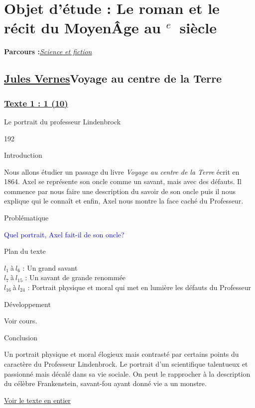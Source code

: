 \documentclass[12pt,a4paper]{article}
\begin{document}
		\section[Sciences et fiction]{Objet d'\'etude : Le roman et le r\'ecit du Moyen\^Age au \textsc{}$^{e}$~siècle}
		\textbf{Parcours :}\textit{\underline{Science et fiction}}
			\subsection{\href{.extra/Bio/Jules.pdf}{Jules Vernes}Voyage au centre de la Terre}
				\subsubsection[Texte 1 (9)]{\textbf{\underline{Texte 1 : 1 (10)}}}
			Le portrait du professeur Lindenbrock	
\begin{dingautolist}{192}

\item Introduction \par
Nous allons étudier un passage du livre \textit{Voyage au centre de la Terre} écrit en 1864. Axel se représente son oncle comme un savant, mais avec des défauts.
Il commence par nous faire une description du savoir de son oncle puis il nous explique qui le connaît et enfin, Axel nous montre la face caché du Professeur.
\item Probl\'ematique \par
	\textcolor{blue}{Quel portrait, Axel fait-il de son oncle?}
\item Plan du texte \par	
	$l_{1}~$\`a$~l_{6}$ : Un grand savant\\
    $l_{7}~$\`a$~l_{15}$ : Un savant de grande renommée\\
    $l_{16}~$\`a$~l_{24}$ : Portrait physique et moral qui met en lumière les défauts du Professeur
\item D\'eveloppement \par
        Voir cours.

\item Conclusion \par
Un portrait physique et moral élogieux mais contrasté par certains points du caractère du Professeur Lindenbrock. Le portrait d'un scientifique talentueux et passionné mais décalé dans sa vie sociale.
On peut le rapprocher à la description du célèbre Frankenstein, savant-fou ayant donné vie a un monstre.


\end{dingautolist}
\href{.extra/Textes/J.Verne_texte_1.pdf}{Voir le texte en entier}
\newpage
\end{document}
